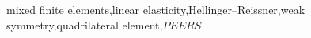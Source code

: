 \begin{keyword}
mixed finite elements\sep linear elasticity\sep Hellinger--Reissner\sep weak symmetry\sep quadrilateral element\sep $PEERS$


\end{keyword}